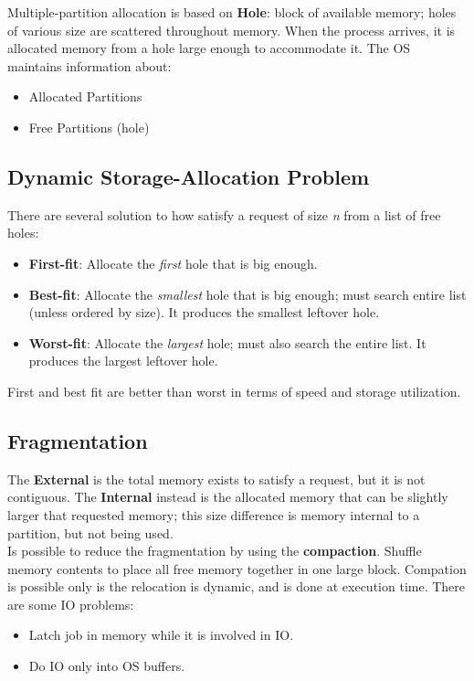 \documentclass[12pt]{article}
\begin{document}
Multiple-partition allocation is based on \textbf{Hole}: block of available memory; holes of various size are scattered throughout memory. When the process arrives, it is allocated memory from a hole large enough to accommodate it. The OS maintains information about:
\begin{itemize}
  \item Allocated Partitions
  \item Free Partitions (hole)
\end{itemize}

\subsection{Dynamic Storage-Allocation Problem}
There are several solution to how satisfy a request of size \textit{n} from a list of free holes:
\begin{itemize}
  \item \textbf{First-fit}: Allocate the \textit{first} hole that is big enough.
  \item \textbf{Best-fit}: Allocate the \textit{smallest} hole that is big enough; must search entire list (unless ordered by size). It produces the smallest leftover hole.
  \item \textbf{Worst-fit}: Allocate the \textit{largest} hole; must also search the entire list. It produces the largest leftover hole.
\end{itemize}
First and best fit are better than worst in terms of speed and storage utilization.

\subsection{Fragmentation}
The \textbf{External} is the total memory exists to satisfy a request, but it is not contiguous. The \textbf{Internal} instead is the allocated memory that can be slightly larger that requested memory; this size difference is memory internal to a partition, but not being used.\\
Is possible to reduce the fragmentation by using the \textbf{compaction}. Shuffle memory contents to place all free memory together in one large block. Compation is possible only is the relocation is dynamic, and is done at execution time. There are some I\/O problems:
\begin{itemize}
  \item Latch job in memory while it is involved in I\/O.
  \item Do I\/O only into OS buffers.
\end{itemize}
\end{document}
